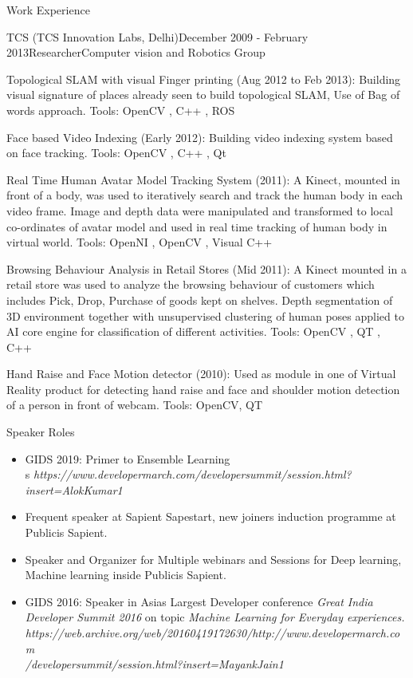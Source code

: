 \documentclass{resume} %
\begin{document}
\begin{rSection}{Work Experience}
\begin{rSubsection}{TCS (TCS Innovation Labs, Delhi)}{December 2009 - February 2013}{Researcher}{Computer vision and Robotics Group}
\item Topological SLAM with visual Finger printing (Aug 2012 to Feb 2013):  
 Building visual signature of places already seen to build topological SLAM, Use of Bag of words approach. Tools: OpenCV , C++ , ROS 
\item Face based Video Indexing (Early 2012): 
Building video indexing system based on face tracking. Tools: OpenCV , C++ , Qt
\item Real Time Human Avatar Model Tracking System (2011): 
A Kinect, mounted in front of a body, was used to iteratively search and track the human body in each video frame. Image and depth data were manipulated and transformed to local co-ordinates of avatar model and used in real time tracking of human body in virtual world. Tools: OpenNI , OpenCV , Visual C++
\item Browsing Behaviour Analysis in Retail Stores (Mid 2011): 
A Kinect mounted in a retail store was used to analyze the browsing behaviour of customers which includes Pick, Drop, Purchase of goods kept on shelves. Depth segmentation of 3D environment together with unsupervised clustering of human poses applied to AI core engine for classification of different activities.  Tools: OpenCV , QT , C++
\item Hand Raise and Face Motion detector (2010): 
Used as module in one of Virtual Reality product for detecting hand raise and face and shoulder motion detection of a person in front of webcam.  Tools: OpenCV, QT  

\end{rSubsection}

\end{rSection} 

\begin{rSection}{Speaker Roles}

    \begin{itemize}
    \item GIDS 2019: Primer to Ensemble Learning\\s
    \textit{https://www.developermarch.com/developersummit/session.html?insert=AlokKumar1}
    \item Frequent speaker at Sapient Sapestart, new joiners induction programme at Publicis Sapient.
    \item Speaker and Organizer for Multiple webinars and Sessions for Deep learning, Machine learning inside Publicis Sapient.
    \item GIDS 2016: Speaker in Asia\textsc{}s Largest Developer conference \emph{Great India Developer Summit 2016} on topic \textit{Machine Learning for Everyday experiences.} \\ 
    \textit{https://web.archive.org/web/20160419172630/http://www.developermarch.com\\/developersummit/session.html?insert=MayankJain1}
    \end{itemize}
\end{rSection}
\end{document}
